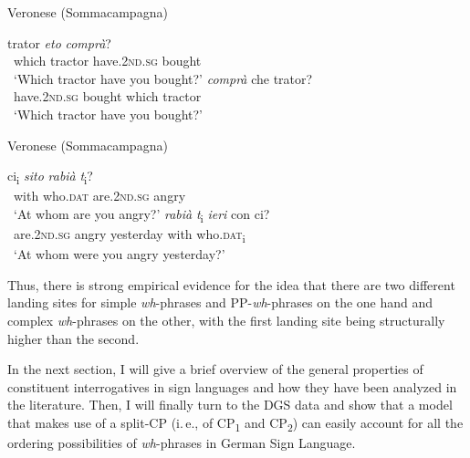 \begin{exe}
\ex Veronese (Sommacampagna)\label{morenorthernitaliana}\begin{xlist}
\ex{} {trator} {\textit{eto}} {\textit{comprà}?} \\
{\textcolor{white}{*}which} {tractor} {have.\textsc{2nd.sg}} {bought}  \\
\trans \textcolor{white}{*}`Which tractor have you bought?' \label{morenorthernitalianaa} 
\ex{} {\textit{comprà}} {che} {trator?} \\
{\textcolor{white}{*}have.\textsc{2nd.sg}} {bought} {which} {tractor}  \\
\trans \textcolor{white}{*}`Which tractor have you bought?' \label{morenorthernitalianab} 
\end{xlist}
\end{exe}

\begin{exe}
\ex Veronese (Sommacampagna)\label{morenorthernitalianb}\begin{xlist}
\ex{} {ci\textsubscript{i}} {\textit{sito}} {\textit{rabià}} {\textit{t}\textsubscript{i}?}  \\
{\textcolor{white}{*}with} {who.\textsc{dat}} {are.\textsc{2nd.sg}} {angry} {} \\
\trans \textcolor{white}{*}`At whom are you angry?' \label{morenorthernitalianba} 
\ex{} {\textit{rabià}} {\textit{t}\textsubscript{i}} {\textit{ieri}} {con} {ci?}  \\
{\textcolor{white}{*}are.\textsc{2nd.sg}} {angry} {} {yesterday} {with} {who.\textsc{dat}\textsubscript{i}}\\
\trans \textcolor{white}{*}`At whom were you angry yesterday?' \label{morenorthernitalianbb} 
\end{xlist}
\end{exe}

\noindent Thus, there is strong empirical evidence for the idea that there are two different landing sites for simple \textit{wh}-phrases and PP-\textit{wh}-phrases on the one hand and complex \textit{wh}-phrases on the other, with the first landing site being structurally higher than the second. 

In the next section, I will give a brief overview of the general properties of constituent interrogatives in sign languages and how they have been analyzed in the literature. Then, I will finally turn to the DGS data and show that a model that makes use of a split-CP (i.\,e., of CP\textsubscript{1} and CP\textsubscript{2}) can easily account for all the ordering possibilities of \textit{wh}-phrases in German Sign Language. 

